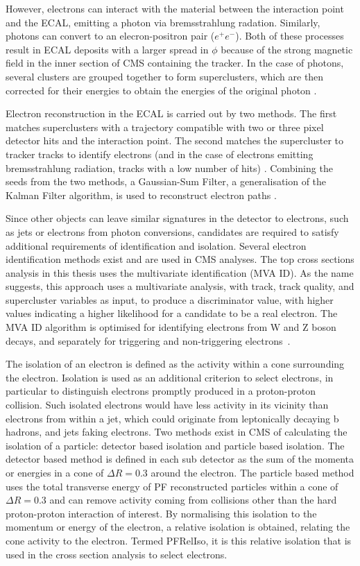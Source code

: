 However, electrons can interact with the material between the interaction point and the ECAL, emitting a
photon via bremsstrahlung radation. Similarly, photons can convert to an elecron-positron pair ($e^{+}e^{-}$).
Both of these processes result in ECAL deposits with a larger spread in $\phi$ because of the strong magnetic
field in the inner section of CMS containing the tracker. In the case of photons, several clusters are grouped
together to form superclusters, which are then corrected for their energies to obtain the energies of the
original photon \cite{photon_reconstruction}.

Electron reconstruction in the ECAL is carried out by two methods. The first matches superclusters with a
trajectory compatible with two or three pixel detector hits and the interaction point. The second matches the
supercluster to tracker tracks to identify electrons (and in the case of electrons emitting bremsstrahlung
radiation, tracks with a low number of hits) \cite{electron_reconstruction}. Combining the seeds from the two
methods, a Gaussian-Sum Filter, a generalisation of the Kalman Filter algorithm, is used to reconstruct
electron paths \cite{electrons_GSF}.

Since other objects can leave similar signatures in the detector to electrons, such as jets or electrons from
photon conversions, candidates are required to satisfy additional requirements of identification and
isolation. Several electron identification methods exist and are used in CMS analyses. The top cross sections
analysis in this thesis uses the multivariate identification (MVA ID). As the name suggests, this approach
uses a multivariate analysis, with track, track quality, and supercluster variables as input, to produce a
discriminator value, with higher values indicating a higher likelihood for a candidate to be a real electron.
The MVA ID algorithm is optimised for identifying electrons from W and Z boson decays, and separately for
triggering and non-triggering electrons~\cite{electron_reconstruction}.

The isolation of an electron is defined as the activity within a cone surrounding the electron. Isolation is
used as an additional criterion to select electrons, in particular to distinguish electrons promptly produced
in a proton-proton collision. Such isolated electrons would have less activity in its vicinity than electrons
from within a jet, which could originate from leptonically decaying b hadrons, and jets faking electrons. Two
methods exist in CMS of calculating the isolation of a particle: detector based isolation and particle based
isolation. The detector based method is defined in each sub detector as the sum of the momenta or energies in
a cone of $\Delta R = 0.3$ around the electron. The particle based method uses the total transverse energy of
PF reconstructed particles within a cone of $\Delta R = 0.3$ and can remove activity coming from collisions
other than the hard proton-proton interaction of interest. By normalising this isolation to the momentum or
energy of the electron, a relative isolation is obtained, relating the cone activity to the electron.
Termed PFRelIso, it is this relative isolation that is used in the cross section analysis to select
electrons.

